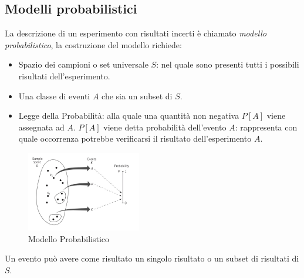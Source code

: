     \subsection{Modelli probabilistici}
        La descrizione di un esperimento con risultati incerti è chiamato \emph{modello probabilistico}, la costruzione del modello richiede:
        \begin{itemize}
            \item {Spazio dei campioni o set universale $S$: nel quale sono presenti tutti i possibili risultati dell'esperimento.}
            \item {Una classe di eventi $A$ che sia un subset di $S$.}
            \item {Legge della Probabilità: alla quale una quantità non negativa $P[A]$ viene assegnata ad $A$. $P[A]$ viene detta probabilità dell'evento $A$: rappresenta
                con quale occorrenza potrebbe verificarsi il risultato dell'esperimento $A$.}
        \end{itemize}
        \begin{figure}[H]
            \centering
            \includegraphics[width = 5cm]{media/Insieme_probabilita.png}
            \caption{Modello Probabilistico} 
        \end{figure}
        Un evento può avere come risultato un singolo risultato o un subset di risultati di $S$.

